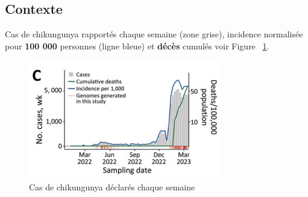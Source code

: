 \subsection{Contexte}
Cas de chikungunya rapportés chaque semaine (zone grise), incidence normalisée pour \textbf{100 000} personnes (ligne bleue) et \textbf{décès} cumulés voir Figure ~\ref{fig:paraguaycases}.
\begin{figure}[h!]
	\centering
	\includegraphics[width=0.8\linewidth]{images/paraguay_cases}
	\caption{Cas de chikungunya déclarés chaque semaine\cite{rapid_expansion_chikungunya_paraguay}}
	\label{fig:paraguaycases}
\end{figure}